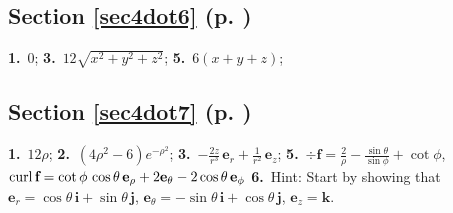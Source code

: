 \begin{multicols}{2}
\subsection*{Section \ref{sec4dot6} (p. \pageref{sec4dot6})}%

\textbf{1.}~$0$;\quad
\textbf{3.}~$12\sqrt{x^2 + y^2 + z^2}$;\quad
\textbf{5.}~$6(x+y+z)$;\quad

\subsection*{Section \ref{sec4dot7} (p. \pageref{sec4dot7})}
\textbf{1.}~$12\rho$;\quad
\textbf{2.}~$(4\rho^2 -6)e^{-\rho^2}$;\quad
\textbf{3.}~$-\frac{2z}{r^3}\,\textbf{e}_{r} + \frac{1}{r^2}\,\textbf{e}_{z}$;\quad
\textbf{5.}~$\div\textbf{f} = \frac{2}{\rho} - \frac{\sin\theta}{\sin\phi} + \cot\phi$, 
$\mathop{\mathrm{curl}}\nolimits\textbf{f}
= \cot\phi\,\cos\theta\,\textbf{e}_{\rho} + 2\textbf{e}_{\theta} -2\cos\theta\,\textbf{e}_{\phi}$
\textbf{6.}~Hint: Start by showing that $\textbf{e}_{r} = \cos\theta\,\textbf{i} + \sin\theta\,\textbf{j}$,
$\textbf{e}_{\theta} = -\sin\theta\,\textbf{i} + \cos\theta\,\textbf{j}$, $\textbf{e}_{z} = \textbf{k}$.
\end{multicols}

